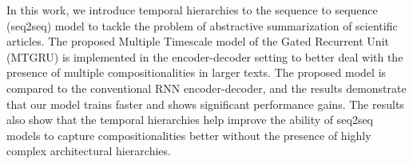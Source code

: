 In this work, we introduce temporal hierarchies to the sequence to sequence (seq2seq) model to tackle the problem of abstractive summarization of scientific articles. The proposed Multiple Timescale model of the Gated Recurrent Unit (MTGRU) is implemented in the encoder-decoder setting to better deal with the presence of multiple compositionalities in larger texts. The proposed model is compared to the conventional RNN encoder-decoder, and the results demonstrate that our model trains faster and shows significant performance gains. The results also show that the temporal hierarchies help improve the ability of seq2seq models to capture compositionalities better without the presence of highly complex architectural hierarchies.
